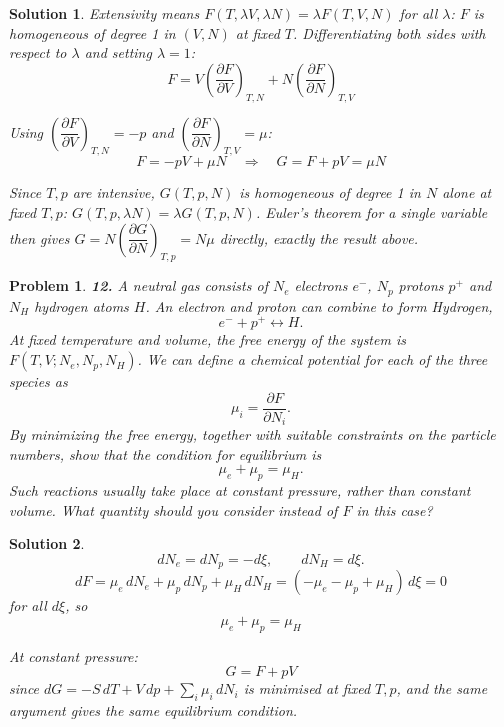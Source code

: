 \documentclass[11pt]{article}
\newtheorem*{problem}{Problem}
\newtheorem*{solution}{Solution}
\begin{document}
\begin{solution}
Extensivity means $F(T,\lambda V,\lambda N)=\lambda F(T,V,N)$ for all $\lambda$: $F$ is
homogeneous of degree 1 in $(V,N)$ at fixed $T$. Differentiating both sides with respect to
$\lambda$ and setting $\lambda=1$:
\[
\boxed{F=V\left(\frac{\partial F}{\partial V}\right)_{T,N}+N\left(\frac{\partial F}{\partial N}\right)_{T,V}}
\]

Using $\left(\dfrac{\partial F}{\partial V}\right)_{T,N}=-p$ and $\left(\dfrac{\partial F}{\partial N}\right)_{T,V}=\mu$:
\[
F=-pV+\mu N
\quad\Rightarrow\quad
G=F+pV=\boxed{\mu N}
\]

Since $T,p$ are intensive, $G(T,p,N)$ is homogeneous of degree 1 in $N$ alone at fixed $T,p$:
$G(T,p,\lambda N)=\lambda G(T,p,N)$. Euler's theorem for a single variable then gives
$G=N\left(\dfrac{\partial G}{\partial N}\right)_{T,p}=N\mu$ directly, exactly the result above.
\end{solution}

\begin{problem}
\textbf{12.} A neutral gas consists of $N_e$ electrons $e^-$, $N_p$ protons $p^+$ and $N_H$
hydrogen atoms $H$. An electron and proton can combine to form Hydrogen,
\[
e^-+p^+\leftrightarrow H.
\]
At fixed temperature and volume, the free energy of the system is $F(T,V;N_e,N_p,N_H)$. We can
define a chemical potential for each of the three species as
\[
\mu_i=\frac{\partial F}{\partial N_i}.
\]
By minimizing the free energy, together with suitable constraints on the particle numbers, show
that the condition for equilibrium is
\[
\mu_e+\mu_p=\mu_H.
\]
Such reactions usually take place at constant pressure, rather than constant volume. What
quantity should you consider instead of $F$ in this case?
\end{problem}

\begin{solution}
\[
dN_e=dN_p=-d\xi,\qquad dN_H=d\xi.
\]
\[
dF=\mu_e\,dN_e+\mu_p\,dN_p+\mu_H\,dN_H=(-\mu_e-\mu_p+\mu_H)\,d\xi=0
\]
for all $d\xi$, so
\[
\boxed{\mu_e+\mu_p=\mu_H}
\]

At constant pressure:
\[
\boxed{G=F+pV}
\]
since $dG=-S\,dT+V\,dp+\sum_i\mu_i\,dN_i$ is minimised at fixed $T,p$, and the same argument
gives the same equilibrium condition.
\end{solution}
\end{document}
